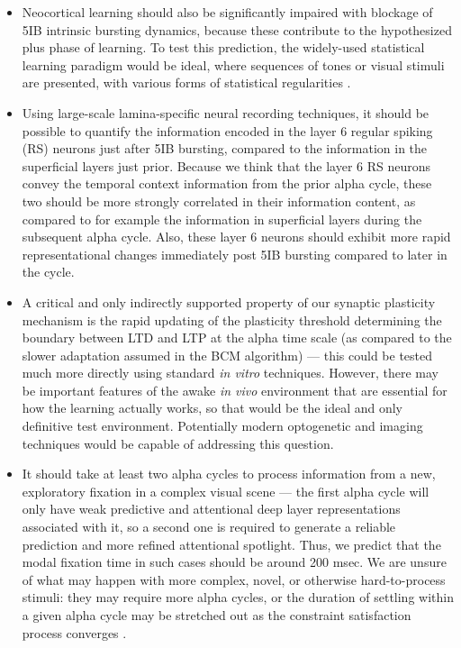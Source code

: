 \documentclass[11pt,twoside]{article}
\newif\myifpdf
\begin{document}
\begin{itemize}
\item Neocortical learning should also be significantly impaired with blockage of 5IB intrinsic bursting dynamics, because these contribute to the hypothesized plus phase of learning.  To test this prediction, the widely-used statistical learning paradigm would be ideal, where sequences of tones or visual stimuli are presented, with various forms of statistical regularities \cite[e.g.,]{AslinSaffranNewport98}.
\item Using large-scale lamina-specific neural recording techniques, it should be possible to quantify the information encoded in the layer 6 regular spiking (RS) neurons just after 5IB bursting, compared to the information in the superficial layers just prior.  Because we think that the layer 6 RS neurons convey the temporal context information from the prior alpha cycle, these two should be more strongly correlated in their information content, as compared to for example the information in superficial layers during the subsequent alpha cycle.  Also, these layer 6 neurons should exhibit more rapid representational changes immediately post 5IB bursting compared to later in the cycle.
\item A critical and only indirectly supported \cite{LimMcKeeWoloszynEtAl15,JedlickaBenuskovaAbraham15,ZenkeGerstnerGanguli17} property of our synaptic plasticity mechanism is the rapid updating of the plasticity threshold determining the boundary between LTD and LTP at the alpha time scale (as compared to the slower adaptation assumed in the BCM algorithm) --- this could be tested much more directly using standard {\em in vitro} techniques.  However, there may be important features of the awake {\em in vivo} environment that are essential for how the learning actually works, so that would be the ideal and only definitive test environment.  Potentially modern optogenetic and imaging techniques would be capable of addressing this question.
\item It should take at least two alpha cycles to process information from a new, exploratory fixation in a complex visual scene --- the first alpha cycle will only have weak predictive and attentional deep layer representations associated with it, so a second one is required to generate a reliable prediction and more refined attentional spotlight.  Thus, we predict that the modal fixation time in such cases should be around 200 msec.  We are unsure of what may happen with more complex, novel, or otherwise hard-to-process stimuli: they may require more alpha cycles, or the duration of settling within a given alpha cycle may be stretched out as the constraint satisfaction process converges \cite{WyatteCurranOReilly12}.

\end{itemize}
\end{document}
